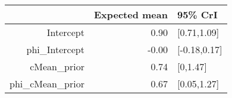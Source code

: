 \begin{tabular}{rrl}
  \hline
 & Expected mean & 95\% CrI \\ 
  \hline
Intercept & 0.90 & [0.71,1.09] \\ 
  phi\_Intercept & -0.00 & [-0.18,0.17] \\ 
  cMean\_prior & 0.74 & [0,1.47] \\ 
  phi\_cMean\_prior & 0.67 & [0.05,1.27] \\ 
   \hline
\end{tabular}

